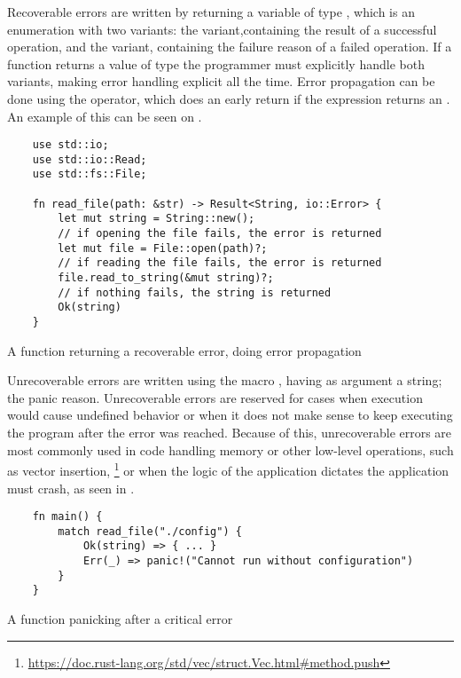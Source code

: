 Recoverable errors are written by returning a variable of type , which is an enumeration with two variants: the 
variant,containing the result of a successful operation, and the 
variant, containing the failure reason of a failed operation. If a function
returns a value of type  the programmer must explicitly
handle both variants, making error handling explicit all the time. Error
propagation can be done using the  operator, which does an early
return if the expression returns an . An example of this can be
seen on .

\begin{listing}[ht]
	\begin{verbatim}
    use std::io;
    use std::io::Read;
    use std::fs::File;

    fn read_file(path: &str) -> Result<String, io::Error> {
        let mut string = String::new();
        // if opening the file fails, the error is returned
        let mut file = File::open(path)?;
        // if reading the file fails, the error is returned
        file.read_to_string(&mut string)?;
        // if nothing fails, the string is returned
        Ok(string)
    }
    \end{verbatim}
  \caption{A function returning a recoverable error, doing error propagation}
  \label{lst:recoverable_error}
\end{listing}

Unrecoverable errors are written using the macro , having as
argument a string; the panic reason. Unrecoverable errors are reserved for cases
when execution would cause undefined behavior or when it does not make sense to
keep executing the program after the error was reached. Because of this,
unrecoverable errors are most commonly used in code handling memory or other
low-level operations, such as vector insertion,
\footnote{\url{https://doc.rust-lang.org/std/vec/struct.Vec.html\#method.push}}
or when the logic of the application dictates the application must crash, as
seen in .


\begin{listing}[ht]
	\begin{verbatim}
    fn main() {
        match read_file("./config") {
            Ok(string) => { ... }
            Err(_) => panic!("Cannot run without configuration")
        }
    }
    \end{verbatim}
  \caption{A function panicking after a critical error}
  \label{lst:unrecoverable_error}
\end{listing}

